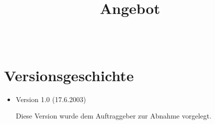 \documentclass[a4paper,titlepage,12pt,ngerman]{scrbook}
\title {\huge \product\\[0.5cm]\large Angebot\\[0.5cm] \version
  \\[1cm] \Large \company}
\begin{document}

\maketitle


\section*{Versionsgeschichte}

\begin{itemize}

\item Version 1.0 (17.6.2003)

  Diese Version wurde dem Auftraggeber zur Abnahme vorgelegt.

\end{itemize}


\tableofcontents











\appendix


\end{document}
